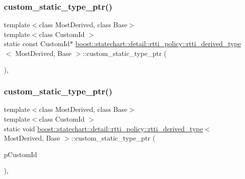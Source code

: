 \subsubsection{\texorpdfstring{custom\+\_\+static\+\_\+type\+\_\+ptr()}{custom\_static\_type\_ptr()}\hspace{0.1cm}{\footnotesize\ttfamily [1/2]}}
{\footnotesize\ttfamily template$<$class Most\+Derived, class Base$>$ \\
template$<$class Custom\+Id $>$ \\
static const Custom\+Id$\ast$ \mbox{\hyperlink{classboost_1_1statechart_1_1detail_1_1rtti__policy_1_1rtti__derived__type}{boost\+::statechart\+::detail\+::rtti\+\_\+policy\+::rtti\+\_\+derived\+\_\+type}}$<$ Most\+Derived, Base $>$\+::custom\+\_\+static\+\_\+type\+\_\+ptr (\begin{DoxyParamCaption}{ }\end{DoxyParamCaption})\hspace{0.3cm}{\ttfamily [inline]}, {\ttfamily [static]}}

\mbox{\label{classboost_1_1statechart_1_1detail_1_1rtti__policy_1_1rtti__derived__type_a7b6c26ef032d096d78207f3739f4890e}} 
\subsubsection{\texorpdfstring{custom\+\_\+static\+\_\+type\+\_\+ptr()}{custom\_static\_type\_ptr()}\hspace{0.1cm}{\footnotesize\ttfamily [2/2]}}
{\footnotesize\ttfamily template$<$class Most\+Derived, class Base$>$ \\
template$<$class Custom\+Id $>$ \\
static void \mbox{\hyperlink{classboost_1_1statechart_1_1detail_1_1rtti__policy_1_1rtti__derived__type}{boost\+::statechart\+::detail\+::rtti\+\_\+policy\+::rtti\+\_\+derived\+\_\+type}}$<$ Most\+Derived, Base $>$\+::custom\+\_\+static\+\_\+type\+\_\+ptr (\begin{DoxyParamCaption}\item[{const Custom\+Id $\ast$}]{p\+Custom\+Id }\end{DoxyParamCaption})\hspace{0.3cm}{\ttfamily [inline]}, {\ttfamily [static]}}

